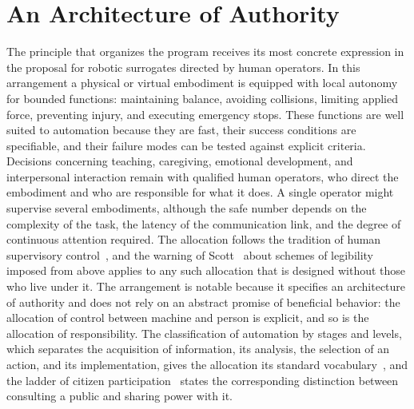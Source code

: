 \chapter{An Architecture of Authority}
\label{ch:13}

The principle that organizes the program receives its most concrete expression in the proposal for robotic surrogates directed by human operators. In this arrangement a physical or virtual embodiment is equipped with local autonomy for bounded functions: maintaining balance, avoiding collisions, limiting applied force, preventing injury, and executing emergency stops. These functions are well suited to automation because they are fast, their success conditions are specifiable, and their failure modes can be tested against explicit criteria. Decisions concerning teaching, caregiving, emotional development, and interpersonal interaction remain with qualified human operators, who direct the embodiment and who are responsible for what it does. A single operator might supervise several embodiments, although the safe number depends on the complexity of the task, the latency of the communication link, and the degree of continuous attention required. The allocation follows the tradition of human supervisory control~\cite{sheridan1992}, and the warning of Scott~\cite{scott1998} about schemes of legibility imposed from above applies to any such allocation that is designed without those who live under it. The arrangement is notable because it specifies an architecture of authority and does not rely on an abstract promise of beneficial behavior: the allocation of control between machine and person is explicit, and so is the allocation of responsibility. The classification of automation by stages and levels, which separates the acquisition of information, its analysis, the selection of an action, and its implementation, gives the allocation its standard vocabulary~\cite{parasuraman2000}, and the ladder of citizen participation~\cite{arnstein1969} states the corresponding distinction between consulting a public and sharing power with it.

